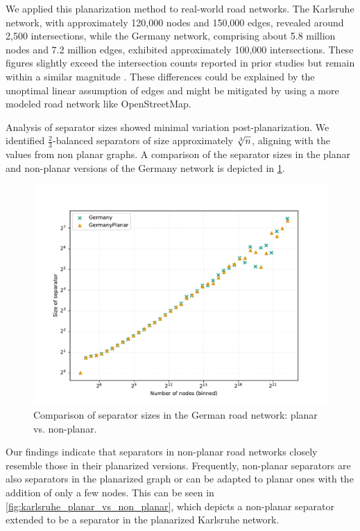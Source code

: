 We applied this planarization method to real-world road networks. The Karlsruhe
network, with approximately 120,000 nodes and 150,000 edges, revealed around
2,500 intersections, while the Germany network, comprising about 5.8 million
nodes and 7.2 million edges, exhibited approximately 100,000 intersections.
These figures slightly exceed the  intersection counts reported
in prior studies but remain within a similar magnitude
\cite{eppstein_linear-time_2010}. These differences could be explained by the
unoptimal linear assumption of edges and might be mitigated by using a more
modeled road network like OpenStreetMap.

Analysis of separator sizes showed minimal variation post-planarization. We
identified \(\frac{2}{3}\)-balanced separators of size approximately
\(\sqrt[3]{n}\), aligning with the values from non planar graphs. A comparison of
the separator sizes in the planar and non-planar versions of the Germany
network is depicted in \cref{fig:germany_planar_vs_non_planar}.

\begin{figure}
	\centering
	\includegraphics[width=0.8\linewidth]{graphics/GermanyPlanarVsNonPlanar.pdf}
	\caption{Comparison of separator sizes in the German road network: planar vs. non-planar.}
	\label{fig:germany_planar_vs_non_planar}
\end{figure}

Our findings indicate that separators in non-planar road networks closely
resemble those in their planarized versions. Frequently, non-planar separators
are also separators in the planarized graph or can be adapted to planar ones
with the addition of only a few nodes. This can be seen in
\cref{fig:karlsruhe_planar_vs_non_planar}, which depicts a non-planar separator
extended to be a separator in the planarized Karlsruhe network.

